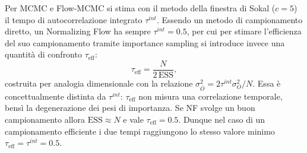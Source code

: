 Per MCMC e Flow-MCMC si stima con il metodo della finestra di Sokal ($c=5$) il tempo di autocorrelazione integrato $\tau^{int}$. Essendo un metodo di campionamento diretto, un Normalizing Flow ha sempre $\tau^{int} = 0.5$, per cui per stimare l'efficienza del suo campionamento tramite importance sampling si introduce invece una quantità di confronto $\tau_{\text{eff}}$:
\begin{equation}
    \tau_{\text{eff}} = \frac{N}{2\,\mathrm{ESS}},
    \label{eq:tau_eff}
\end{equation}
costruita per analogia dimensionale con la relazione $\sigma^2_{\bar O} = 2\tau^{int}\sigma^2_O/N$. Essa è concettualmente distinta da $\tau^{int}$: $\tau_{\text{eff}}$ non misura una correlazione temporale, bensì la degenerazione dei pesi di importanza. Se NF svolge un buon campionamento allora $\mathrm{ESS} \approx N$ e vale $\tau_{\text{eff}} = 0.5$. Dunque nel caso di un campionamento efficiente i due tempi raggiungono lo stesso valore minimo $\tau_{\text{eff}} = \tau^{int} = 0.5$.

